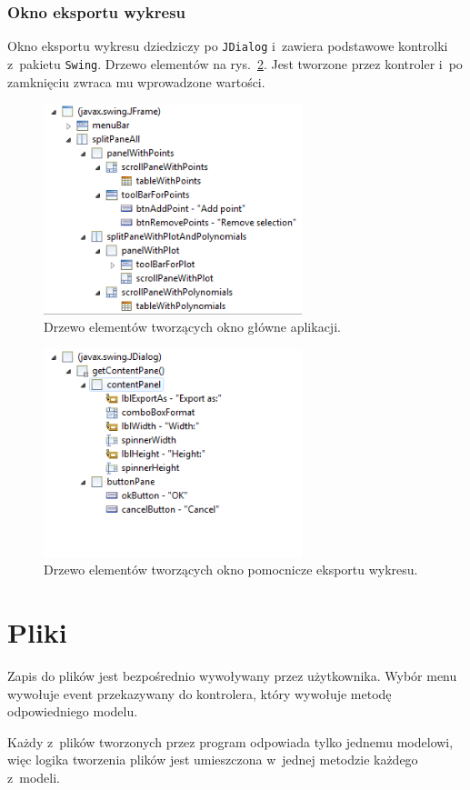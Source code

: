 \documentclass[10pt,a4paper]{article}
\newcommand{\f}[1]{\texttt{#1}}
\begin{document}
\subsubsection{Okno eksportu wykresu}

Okno eksportu wykresu dziedziczy po \f{JDialog} i~zawiera podstawowe kontrolki
z~pakietu \f{Swing}. Drzewo elementów na rys.~\ref{fig:wykres-rysuj-widok}. Jest
tworzone przez kontroler i~po zamknięciu zwraca mu wprowadzone wartości.

\begin{figure}[p]
  \centering
  \includegraphics[width=0.67\textwidth]{figury/aplikacja-widok}
  \caption{Drzewo elementów tworzących okno główne aplikacji.}
  \label{fig:aplikacja-widok}
\end{figure}

\begin{figure}[p]
  \centering
  \includegraphics[width=0.67\textwidth]{figury/wykres-rysuj-widok}
  \caption{Drzewo elementów tworzących okno pomocnicze eksportu wykresu.}
  \label{fig:wykres-rysuj-widok}
\end{figure}

\section{Pliki}

Zapis do plików jest bezpośrednio wywoływany przez użytkownika. Wybór menu
wywołuje event przekazywany do kontrolera, który wywołuje metodę odpowiedniego
modelu.

Każdy z~plików tworzonych przez program odpowiada tylko jednemu modelowi, więc
logika tworzenia plików jest umieszczona w~jednej metodzie każdego z~modeli.
\end{document}
